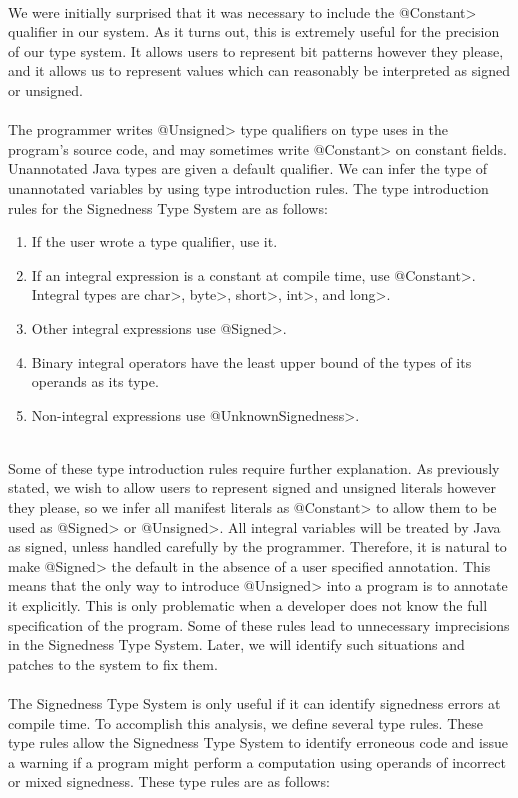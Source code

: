 \noindent\\
We were initially surprised that it was necessary to include the \<@Constant>
qualifier in our system. As it turns out, this is extremely useful for the
precision of our type system. It allows users to represent bit patterns
however they please, and it allows us to represent values which can
reasonably be interpreted as signed or unsigned.\\
\\
The programmer writes \<@Unsigned> type qualifiers on type uses
in the program's source code, and may sometimes write \<@Constant> on
constant fields.  Unannotated Java types
are given a default qualifier. We can infer the type of unannotated variables
by using type introduction rules. The type introduction rules for the
Signedness Type System are as follows:

\begin{enumerate}
  \item If the user wrote a type qualifier, use it.
  \item If an integral expression is a constant at compile time, use
    \<@Constant>.
    Integral types are \<char>, \<byte>, \<short>, \<int>, and \<long>.
  \item Other integral expressions use \<@Signed>.
  \item Binary integral operators have the least upper bound of the types of
  its operands as its type.
  \item Non-integral expressions use \<@UnknownSignedness>.
\end{enumerate}

\noindent\\
Some of these type introduction rules require further explanation. As
previously stated, we wish to allow users to represent signed and unsigned
literals however they please, so we infer all manifest literals as
\<@Constant> to allow them to be used as \<@Signed> or \<@Unsigned>. All
integral variables will be treated by Java as signed, unless handled
carefully by the programmer. Therefore, it is natural to make \<@Signed> the
default in the absence of a user specified annotation. This means that
the only way to introduce \<@Unsigned> into a program is to annotate it
explicitly. This is only problematic when a developer does not know the
full specification of the program. Some of these rules lead to unnecessary
imprecisions in the Signedness Type System. Later, we will identify such
situations and patches to the system to fix them.\\
\\
The Signedness Type System is only useful if it can identify signedness errors
at compile time. To accomplish this analysis, we define several
type rules. These type rules allow the Signedness Type System to identify
erroneous code and issue a warning if a program
might perform a computation using operands of incorrect or mixed signedness.
These type rules are as follows:

